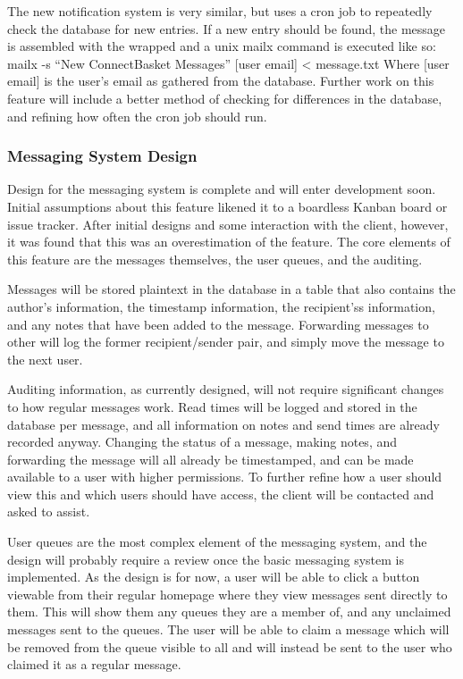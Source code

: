 \documentclass[onecolumn, draftclsnofoot,10pt, compsoc]{IEEEtran}
\begin{document}
The new notification system is very similar, but uses a cron job to repeatedly check the database for new entries. If a new entry should be found, the message is assembled with the wrapped and a unix mailx command is executed like so:
	\newline
	mailx -s “New ConnectBasket Messages” [user email] < message.txt
\newline
Where [user email] is the user's email as gathered from the database. Further work on this feature will include a better method of checking for differences in the database, and refining how often the cron job should run.
\subsubsection{Messaging System Design}
Design for the messaging system is complete and will enter development soon. Initial assumptions about this feature likened it to a boardless Kanban board or issue tracker. After initial designs and some interaction with the client, however, it was found that this was an overestimation of the feature. The core elements of this feature are the messages themselves, the user queues, and the auditing. 

Messages will be stored plaintext in the database in a table that also contains the author's information, the timestamp information, the recipient'ss information, and any notes that have been added to the message. Forwarding messages to other will log the former recipient/sender pair, and simply move the message to the next user.

Auditing information, as currently designed, will not require significant changes to how regular messages work. Read times will be logged and stored in the database per message, and all information on notes and send times are already recorded anyway. Changing the status of a message, making notes, and forwarding the message will all already be timestamped, and can be made available to a user with higher permissions. To further refine how a user should view this and which users should have access, the client will be contacted and asked to assist. 

User queues are the most complex element of the messaging system, and the design will probably require a review once the basic messaging system is implemented. As the design is for now, a user will be able to click a button viewable from their regular homepage where they view messages sent directly to them. This will show them any queues they are a member of, and any unclaimed messages sent to the queues. The user will be able to claim a message which will be removed from the queue visible to all and will instead be sent to the user who claimed it as a regular message.
\end{document}
